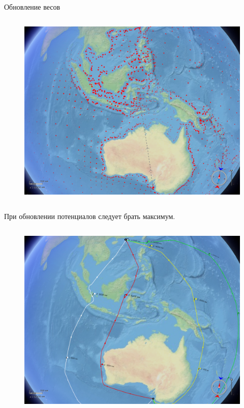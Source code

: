 \documentclass[russian, hyperref={unicode}]{beamer}
\theoremstyle{definition}
\begin{document}
\begin{frame}{Обновление весов}
{\begin{columns}
            \begin{figure}
                \includegraphics[clip=true, trim = 280pt 0 20pt 0, width=\textwidth]{potentials-update/max4}
            \end{figure}
        \end{columns}
        
        \begin{center}
            При обновлении потенциалов следует брать максимум.
        \end{center}
    }
   
     {
        \begin{columns}
            \begin{figure}
                \includegraphics[clip=true, trim = 280pt 0 20pt 0, width=\textwidth]{potentials-update/accum_result}
            \end{figure}


\end{columns}}
\end{frame}
\end{document}
